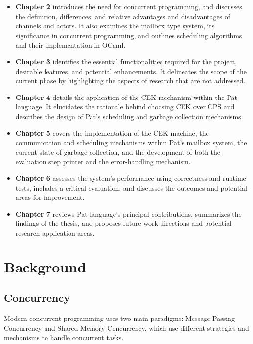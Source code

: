 \documentclass{l4proj}
\begin{document}
\begin{itemize}
  \item \textbf{Chapter 2} introduces the need for concurrent programming, and discusses the definition, differences, and relative advantages and disadvantages of channels and actors. It also examines the mailbox type system, its significance in concurrent programming, and outlines scheduling algorithms and their implementation in OCaml.
  
  \item \textbf{Chapter 3} identifies the essential functionalities required for the project, desirable features, and potential enhancements. It delineates the scope of the current phase by highlighting the aspects of research that are not addressed.
  
  \item \textbf{Chapter 4} details the application of the CEK mechanism within the Pat language. It elucidates the rationale behind choosing CEK over CPS and describes the design of Pat's scheduling and garbage collection mechanisms.
  
  \item \textbf{Chapter 5} covers the implementation of the CEK machine, the communication and scheduling mechanisms within Pat's mailbox system, the current state of garbage collection, and the development of both the evaluation step printer and the error-handling mechanism.
  
  \item \textbf{Chapter 6} assesses the system's performance using correctness and runtime tests, includes a critical evaluation, and discusses the outcomes and potential areas for improvement.
  
  \item \textbf{Chapter 7} reviews Pat language's principal contributions, summarizes the findings of the thesis, and proposes future work directions and potential research application areas.
\end{itemize}


\chapter{Background}

\section{Concurrency}
Modern concurrent programming uses two main paradigms: Message-Passing Concurrency and Shared-Memory Concurrency, which use different strategies and mechanisms to handle concurrent tasks.
\end{document}
